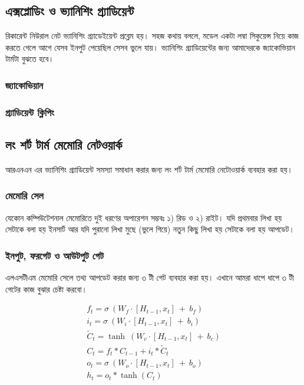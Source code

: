 \documentclass{book}
\begin{document}
\subsection{এক্সপ্লোডিং ও ভ্যানিশিং গ্র্যাডিয়েন্ট}
রিকারেন্ট নিউরাল নেট ভ্যানিশিং গ্র্যাডেইয়েন্ট প্রব্লেম হয়। সহজ কথায় বললে, মডেল একটা লম্বা সিকুয়েন্স নিয়ে কাজ করতে গেলে আগে যেসব ইনপুট পেয়েছিল সেসব ভুলে যায়।
ভ্যানিশিং গ্র্যাডিয়েন্টের জন্য আমাদেরকে জ্যাকোভিয়ান টার্মটা বুঝতে হবে। 

\subsubsection{জ্যাকোভিয়ান}
\subsubsection{গ্র্যাডিয়েন্ট ক্লিপিং}

\subsection{লং শর্ট টার্ম মেমোরি নেটওয়ার্ক}
আরএনএন এর ভ্যানিশিং গ্র্যাডিয়েন্ট সমস্যা সমাধান করার জন্য লং শর্ট টার্ম মেমোরি নেটোওয়ার্ক ব্যবহার করা হয়। 
\subsubsection{মেমোরি সেল}
যেকোন কম্পিউটেশনাল মেমোরিতে দুই ধরণের অপারেশন সম্ভবঃ ১) রিড ও ২) রাইট। যদি প্রথমবার লিখা হয় সেটাকে বলা হয় ইনসার্ট আর যদি পুরানো লিখা মুছে (ভুলে গিয়ে) নতুন কিছু লিখা হয় সেটাকে বলা হয় আপডেট। 
 
\subsubsection{ইনপুট, ফরগেট ও আউটপুট গেট}
এলএসটীএম মেমোরি সেলে তথ্য আপডেট করার জন্য ৩ টী গেট ব্যবহার করা হয়। এখানে আমরা ধাপে ধাপে ৩ টী গেটের কাজ বুঝার চেষ্টা করবো। 
 
\begin{align} %
   f_t = \sigma \ (W_f \cdot [H_{t-1} , x_t] \ + \ b_f) \\
   i_t = \sigma \ (W_i \cdot [H_{t-1} , x_t] \ + \ b_i) \\
   \tilde C_t = \tanh \ (W_c \cdot [H_{t-1} , x_t] \ + \ b_c) \\
   C_t = f_t * C_{t-1} + i_t * \tilde C_t \\
   o_t = \sigma \ (W_o \cdot [H_{t-1} , x_t] \ + \ b_o) \\ 
   h_t = o_t * \tanh(C_t) \\ 
\end{align}
\end{document}
